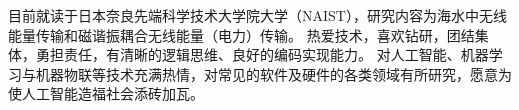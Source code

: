

\begin{cvparagraph}

目前就读于日本奈良先端科学技术大学院大学（NAIST），研究内容为海水中无线能量传输和磁谐振耦合无线能量（电力）传输。
热爱技术，喜欢钻研，团结集体，勇担责任，有清晰的逻辑思维、良好的编码实现能力。
对人工智能、机器学习与机器物联等技术充满热情，对常见的软件及硬件的各类领域有所研究，愿意为使人工智能造福社会添砖加瓦。
\end{cvparagraph}